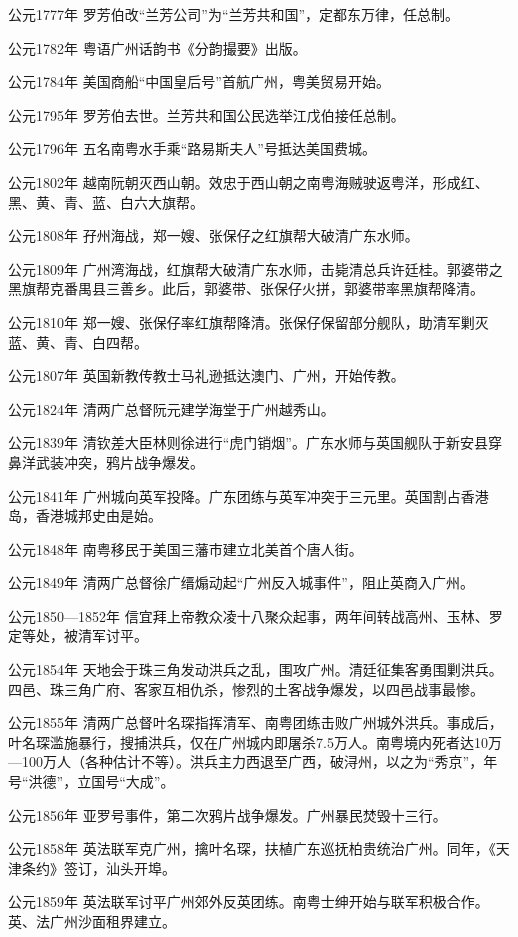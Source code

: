 公元1777年 罗芳伯改“兰芳公司”为“兰芳共和国”，定都东万律，任总制。

公元1782年 粤语广州话韵书《分韵撮要》出版。

公元1784年 美国商船“中国皇后号”首航广州，粤美贸易开始。

公元1795年 罗芳伯去世。兰芳共和国公民选举江戊伯接任总制。

公元1796年 五名南粤水手乘“路易斯夫人”号抵达美国费城。

公元1802年 越南阮朝灭西山朝。效忠于西山朝之南粤海贼驶返粤洋，形成红、黑、黄、青、蓝、白六大旗帮。

公元1808年 孖州海战，郑一嫂、张保仔之红旗帮大破清广东水师。

公元1809年 广州湾海战，红旗帮大破清广东水师，击毙清总兵许廷桂。郭婆带之黑旗帮克番禺县三善乡。此后，郭婆带、张保仔火拼，郭婆带率黑旗帮降清。

公元1810年 郑一嫂、张保仔率红旗帮降清。张保仔保留部分舰队，助清军剿灭蓝、黄、青、白四帮。

公元1807年 英国新教传教士马礼逊抵达澳门、广州，开始传教。

公元1824年 清两广总督阮元建学海堂于广州越秀山。

公元1839年 清钦差大臣林则徐进行“虎门销烟”。广东水师与英国舰队于新安县穿鼻洋武装冲突，鸦片战争爆发。

公元1841年 广州城向英军投降。广东团练与英军冲突于三元里。英国割占香港岛，香港城邦史由是始。

公元1848年 南粤移民于美国三藩市建立北美首个唐人街。

公元1849年 清两广总督徐广缙煽动起“广州反入城事件”，阻止英商入广州。

公元1850—1852年 信宜拜上帝教众凌十八聚众起事，两年间转战高州、玉林、罗定等处，被清军讨平。

公元1854年 天地会于珠三角发动洪兵之乱，围攻广州。清廷征集客勇围剿洪兵。四邑、珠三角广府、客家互相仇杀，惨烈的土客战争爆发，以四邑战事最惨。

公元1855年 清两广总督叶名琛指挥清军、南粤团练击败广州城外洪兵。事成后，叶名琛滥施暴行，搜捕洪兵，仅在广州城内即屠杀7.5万人。南粤境内死者达10万—100万人（各种估计不等）。洪兵主力西退至广西，破浔州，以之为“秀京”，年号“洪德”，立国号“大成”。

公元1856年 亚罗号事件，第二次鸦片战争爆发。广州暴民焚毁十三行。

公元1858年 英法联军克广州，擒叶名琛，扶植广东巡抚柏贵统治广州。同年，《天津条约》签订，汕头开埠。

公元1859年 英法联军讨平广州郊外反英团练。南粤士绅开始与联军积极合作。英、法广州沙面租界建立。

